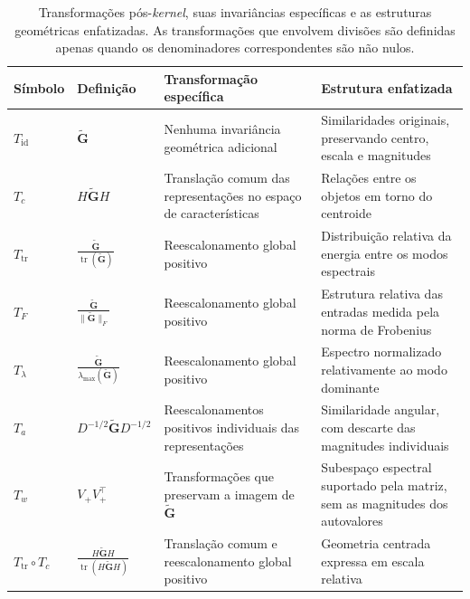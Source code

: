 \begin{table}[ht]
\scriptsize
\centering
\caption{Transformações pós-\textit{kernel}, suas invariâncias específicas e as estruturas geométricas enfatizadas. As transformações que envolvem divisões são definidas apenas quando os denominadores correspondentes são não nulos.}
\label{tab:T_catalog}
\renewcommand{\arraystretch}{1.4}
\begin{tabular}{p{1.5cm} p{2.5cm} p{4.3cm} p{4.6cm}}
\hline
\textbf{Símbolo}
&
\textbf{Definição}
&
\textbf{Transformação específica}
&
\textbf{Estrutura enfatizada}
\\
\hline

$T_{\mathrm{id}}$
&
$\widetilde{\mathbf{G}}$
&
Nenhuma invariância geométrica adicional
&
Similaridades originais, preservando centro, escala e magnitudes
\\

$T_c$
&
$H\widetilde{\mathbf{G}}H$
&
Translação comum das representações no espaço de características
&
Relações entre os objetos em torno do centroide
\\

$T_{\mathrm{tr}}$
&
$\displaystyle
\frac{\widetilde{\mathbf{G}}}
{\operatorname{tr}(\widetilde{\mathbf{G}})}$
&
Reescalonamento global positivo
&
Distribuição relativa da energia entre os modos espectrais
\\

$T_F$
&
$\displaystyle
\frac{\widetilde{\mathbf{G}}}
{\|\widetilde{\mathbf{G}}\|_F}$
&
Reescalonamento global positivo
&
Estrutura relativa das entradas medida pela norma de Frobenius
\\

$T_{\lambda}$
&
$\displaystyle
\frac{\widetilde{\mathbf{G}}}
{\lambda_{\max}(\widetilde{\mathbf{G}})}$
&
Reescalonamento global positivo
&
Espectro normalizado relativamente ao modo dominante
\\

$T_a$
&
$\displaystyle
D^{-1/2}
\widetilde{\mathbf{G}}
D^{-1/2}$
&
Reescalonamentos positivos individuais das representações
&
Similaridade angular, com descarte das magnitudes individuais
\\

$T_w$
&
$V_+V_+^{\top}$
&
Transformações que preservam a imagem de $\widetilde{\mathbf{G}}$
&
Subespaço espectral suportado pela matriz, sem as magnitudes dos autovalores
\\

$T_{\mathrm{tr}}\circ T_c$
&
$\displaystyle
\frac{
    H\widetilde{\mathbf{G}}H
}{
    \operatorname{tr}
    \left(
        H\widetilde{\mathbf{G}}H
    \right)
}$
&
Translação comum e reescalonamento global positivo
&
Geometria centrada expressa em escala relativa
\\

\hline
\end{tabular}
\end{table}


